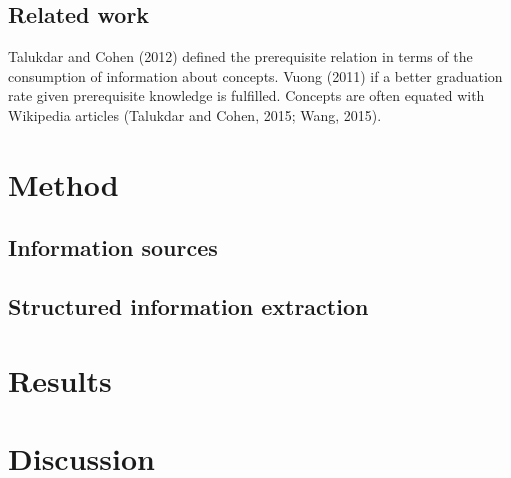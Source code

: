 \documentclass{article}
\begin{document}




\subsection{Related work}
Talukdar and Cohen (2012) defined the prerequisite relation in terms of the consumption of information about concepts. Vuong (2011) if a better graduation rate given prerequisite knowledge is fulfilled. Concepts are often equated with Wikipedia articles (Talukdar and Cohen, 2015; Wang, 2015).

\section{Method}

\subsection{Information sources}

\subsection{Structured information extraction}



\section{Results}



\section{Discussion}





\end{document}
